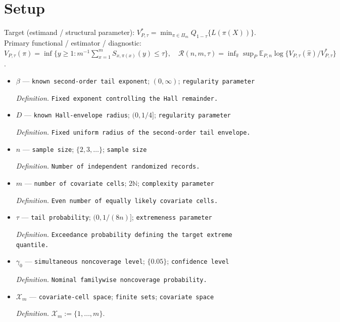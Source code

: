 \documentclass{article}
\begin{document}
\section{Setup}

Target (estimand / structural parameter): \(V^*_{P,\tau}=\min_{\pi\in\Pi_m}Q_{1-\tau}\{L(\pi(X))\}\).
Primary functional / estimator / diagnostic: \(V_{P,\tau}(\pi)=\inf\{y\ge1:m^{-1}\sum_{x=1}^mS_{x,\pi(x)}(y)\le\tau\},\quad \mathcal R(n,m,\tau)=\inf_{\widehat\pi}\sup_P \mathbb E_{P,n}\log\{V_{P,\tau}(\widehat\pi)/V^*_{P,\tau}\}\).
\begin{itemize}
  \item \(\beta\) --- \texttt{known second-\allowbreak{}order tail exponent}; \((0,\infty)\); \texttt{regularity parameter}
  \par\smallskip\noindent\emph{Definition.} \texttt{Fixed exponent controlling the Hall remainder.}
  \item \(D\) --- \texttt{known Hall-\allowbreak{}envelope radius}; \((0,1/4]\); \texttt{regularity parameter}
  \par\smallskip\noindent\emph{Definition.} \texttt{Fixed uniform radius of the second-\allowbreak{}order tail envelope.}
  \item \(n\) --- \texttt{sample size}; \(\{2,3,\ldots\}\); \texttt{sample size}
  \par\smallskip\noindent\emph{Definition.} \texttt{Number of independent randomized records.}
  \item \(m\) --- \texttt{number of covariate cells}; \(2\mathbb N\); \texttt{complexity parameter}
  \par\smallskip\noindent\emph{Definition.} \texttt{Even number of equally likely covariate cells.}
  \item \(\tau\) --- \texttt{tail probability}; \((0,1/(8n)]\); \texttt{extremeness parameter}
  \par\smallskip\noindent\emph{Definition.} \texttt{Exceedance probability defining the target extreme quantile.}
  \item \(\gamma_0\) --- \texttt{simultaneous noncoverage level}; \(\{0.05\}\); \texttt{confidence level}
  \par\smallskip\noindent\emph{Definition.} \texttt{Nominal familywise noncoverage probability.}
  \item \(\mathcal X_m\) --- \texttt{covariate-\allowbreak{}cell space}; \texttt{finite sets}; \texttt{covariate space}
  \par\smallskip\noindent\emph{Definition.} \(\mathcal X_m:=\{1,\ldots,m\}\).

\end{itemize}
\end{document}
